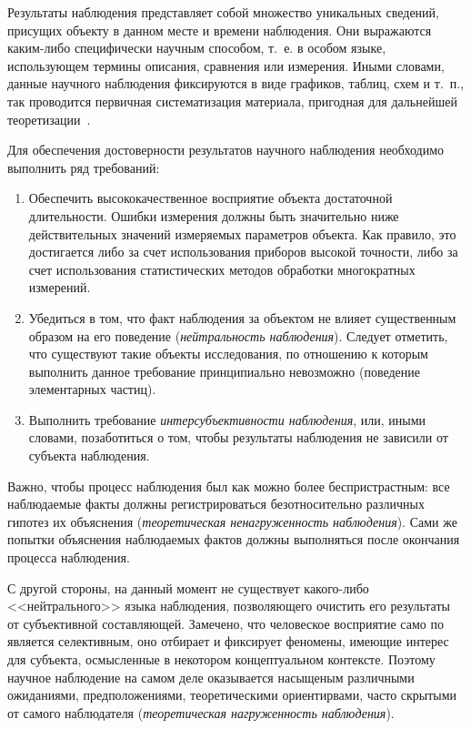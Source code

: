 Результаты наблюдения представляет собой множество уникальных сведений,
присущих объекту в данном месте и времени наблюдения.
Они выражаются каким-либо специфически научным способом,
т.~е. в особом языке, использующем термины описания, сравнения или измерения.
Иными словами, данные научного наблюдения фиксируются в виде графиков, таблиц,
схем и т.~п., так проводится первичная систематизация материала,
пригодная для дальнейшей теоретизации~\cite{ushakov2008}.

Для обеспечения достоверности результатов научного наблюдения
необходимо выполнить ряд требований:
\begin{enumerate}
\item Обеспечить высококачественное восприятие объекта достаточной длительности.
  Ошибки измерения должны быть значительно ниже действительных
  значений измеряемых параметров объекта.
  Как правило, это достигается либо за счет использования приборов высокой точности,
  либо за счет использования статистических методов обработки многократных измерений.
\item Убедиться в том, что факт наблюдения за объектом не влияет существенным
  образом на его поведение (\emph{нейтральность наблюдения}).
  Следует отметить, что существуют такие объекты исследования,
  по отношению к которым выполнить данное требование принципиально невозможно
  (поведение элементарных частиц).
\item Выполнить требование \emph{интерсубъективности наблюдения}, или, иными словами,
  позаботиться о том, чтобы результаты наблюдения не зависили от субъекта наблюдения.
\end{enumerate}

Важно, чтобы процесс наблюдения был как можно более беспристрастным:
все наблюдаемые факты должны регистрироваться безотносительно различных
гипотез их объяснения (\emph{теоретическая ненагруженность наблюдения}).
Сами же попытки объяснения наблюдаемых фактов должны выполняться после
окончания процесса наблюдения.

С другой стороны, на данный момент не существует какого-либо <<нейтрального>>
языка наблюдения, позволяющего очистить его результаты от субъективной составляющей.
Замечено, что человеское восприятие само по является селективным,
оно отбирает и фиксирует феномены, имеющие интерес для субъекта,
осмысленные в некотором концептуальном контексте.
Поэтому научное наблюдение на самом деле оказывается насыщеным различными ожиданиями,
предположениями, теоретическими ориентирвами, часто скрытыми от самого наблюдателя
(\emph{теоретическая нагруженность наблюдения}).

